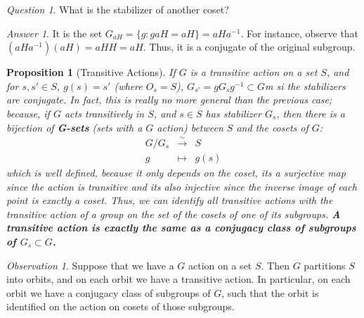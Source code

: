\documentclass[12pt]{article}
\newtheorem{prop}[thm]{Proposition}
\theoremstyle{definition}
\theoremstyle{remark}
\newtheorem*{qst}{Question}
\newtheorem*{ans}{Answer}
\newtheorem{obs}[thm]{Observation}
\numberwithin{equation}{section}
\newcommand\B[1]{\textbf{ #1}}
\begin{document}
\vspace{15pt}

\begin{qst}
        What is the stabilizer of another coset?
\end{qst}

\begin{ans}
        It is the set $G_{aH} = \{g: gaH = aH\} = aHa^{-1}$. For instance, observe that $(aHa^{-1})(aH) = aHH = aH$. Thus, it is a conjugate of the original subgroup.
\end{ans}

\vspace{15pt}

\begin{prop}[Transitive Actions]
        If $G$ is a transitive action on a set $S$, and for $s,s' \in S$, $g(s) = s'$ (where $O_s = S$), $G_{s'} = gG_sg^{-1} \subset G$m si the stabilizers are conjugate. In fact, this is really no more general than the previous case; because, if $G$ acts transitively in $S$, and $s \in S$ has stabilizer $G_s$, then there is a bijection of \B{G-sets} (sets with a $G$ action) between $S$ and the cosets of $G$: \begin{equation}
                \begin{array}{ccc} G/G_s & \xrightarrow{\sim} & S \\ g & \mapsto & g(s)\end{array}
        \end{equation}
        which is well defined, because it only depends on the coset, its a surjective map since the action is transitive and its also injective since the inverse image of each point is exactly a coset. Thus, we can identify all transitive actions with the transitive action of a group on the set of the cosets of one of its subgroups. \B{A transitive action is exactly the same as a conjugacy class of subgroups of $G_s \subset G$.} 
\end{prop}

\vspace{15pt}


\begin{obs}
        Suppose that we have a $G$ action on a set $S$. Then $G$ partitions $S$ into orbits, and on each orbit we have a transitive action. In particular, on each orbit we have a conjugacy class of subgroups of $G$, such that the orbit is identified on the action on cosets of those subgroups.
\end{obs}


\vspace{15pt}
\end{document}
